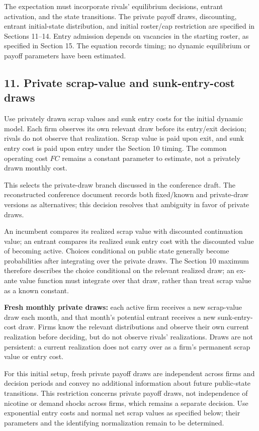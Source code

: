 \documentclass[10pt,]{article}
\begin{document}
The expectation must incorporate rivals' equilibrium decisions, entrant
activation, and the state transitions. The private payoff draws,
discounting, entrant initial-state distribution, and initial roster/cap
restriction are specified in Sections 11--14. Entry admission depends on
vacancies in the starting roster, as specified in Section 15. The
equation records timing; no dynamic equilibrium or payoff parameters
have been estimated.

\subsection{11. Private scrap-value and sunk-entry-cost
draws}\label{private-scrap-value-and-sunk-entry-cost-draws}

Use privately drawn scrap values and sunk entry costs for the initial
dynamic model. Each firm observes its own relevant draw before its
entry/exit decision; rivals do not observe that realization. Scrap value
is paid upon exit, and sunk entry cost is paid upon entry under the
Section 10 timing. The common operating cost \(FC\) remains a constant
parameter to estimate, not a privately drawn monthly cost.

This selects the private-draw branch discussed in the conference draft.
The reconstructed conference document records both fixed/known and
private-draw versions as alternatives; this decision resolves that
ambiguity in favor of private draws.

An incumbent compares its realized scrap value with discounted
continuation value; an entrant compares its realized sunk entry cost
with the discounted value of becoming active. Choices conditional on
public state generally become probabilities after integrating over the
private draws. The Section 10 maximum therefore describes the choice
conditional on the relevant realized draw; an ex-ante value function
must integrate over that draw, rather than treat scrap value as a known
constant.

\textbf{Fresh monthly private draws:} each active firm receives a new
scrap-value draw each month, and that month's potential entrant receives
a new sunk-entry-cost draw. Firms know the relevant distributions and
observe their own current realization before deciding, but do not
observe rivals' realizations. Draws are not persistent: a current
realization does not carry over as a firm's permanent scrap value or
entry cost.

For this initial setup, fresh private payoff draws are independent
across firms and decision periods and convey no additional information
about future public-state transitions. This restriction concerns private
payoff draws, not independence of nicotine or demand shocks across
firms, which remains a separate decision. Use exponential entry costs
and normal net scrap values as specified below; their parameters and the
identifying normalization remain to be determined.
\end{document}
